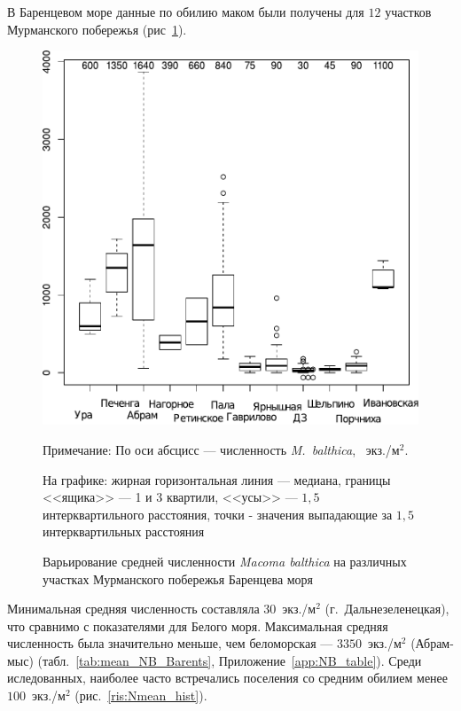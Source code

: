 В Баренцевом море данные по обилию маком были получены для $12$ участков Мурманского побережья (рис~\ref{ris:N_area_Barents}).
	\begin{figure}[p]
	\begin{center}
		\includegraphics[height=0.5\textheight]{../All_N/N2_area_Barents1.pdf}
	\end{center}
	\caption{Варьирование средней численности {\it Macoma balthica} на различных участках Мурманского побережья Баренцева моря}
	{\footnotesize Примечание: По оси абсцисс --- численность {\it M.~balthica}, ~экз./м$^2$.

	На графике: жирная горизонтальная линия --- медиана, границы <<ящика>> --- 1 и 3 квартили, <<усы>> --- $1,5$ интерквартильного расстояния, точки - значения выпадающие за $1,5$ интерквартильных расстояния}
	\label{ris:N_area_Barents}
	\end{figure}
Минимальная средняя численность составляла $30$~экз./м$^2$ (г.~Дальнезеленецкая), что сравнимо с показателями для Белого моря. 
Максимальная средняя численность была значительно меньше, чем беломорская --- $3350$~экз./м$^2$ (Абрам-мыс) (табл.~\ref{tab:mean_NB_Barents}, Приложение~\ref{app:NB_table}). 
Среди иследованных, наиболее часто встречались поселения со средним обилием менее $100$~экз./м$^2$ (рис.~\ref{ris:Nmean_hist}).

